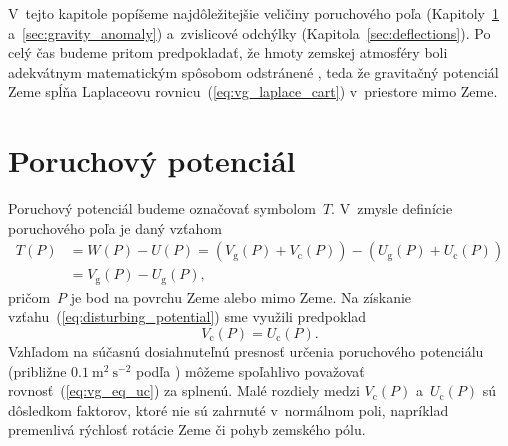 \documentclass[a4paper, 12pt]{book}
\newcommand{\gidx}{\mathrm g}
\newcommand{\cidx}{\mathrm c}
\begin{document}
V~tejto kapitole popíšeme najdôležitejšie veličiny poruchového poľa 
(Kapitoly~\ref{sec:disturbing_potential} a~\ref{sec:gravity_anomaly}) 
a~zvislicové odchýlky (Kapitola~\ref{sec:deflections}).  Po celý čas budeme 
pritom predpokladať, že hmoty zemskej atmosféry boli adekvátnym matematickým 
spôsobom odstránené \parencite[pozri napríklad][]{Janak2006}, teda že 
gravitačný potenciál Zeme spĺňa Laplaceovu rovnicu~(\ref{eq:vg_laplace_cart}) 
v~priestore mimo Zeme.






\section{Poruchový potenciál}
\label{sec:disturbing_potential}

Poruchový potenciál budeme označovať symbolom~$T$.  V~zmysle definície 
poruchového poľa je daný vzťahom
%
\begin{equation}
\label{eq:disturbing_potential}
\begin{split}
T(P) &= W(P) - U(P) = (V_\gidx(P) + V_\cidx(P)) - (U_\gidx(P) + U_\cidx(P))\\
%
&= V_\gidx(P) - U_\gidx(P){,}
\end{split}
\end{equation}
%
pričom~$P$ je bod na povrchu Zeme alebo mimo Zeme.  Na získanie 
vzťahu~(\ref{eq:disturbing_potential}) sme využili predpoklad
%
\begin{equation}
\label{eq:vg_eq_uc}
V_\cidx(P) = U_\cidx(P){.}
\end{equation}
%
Vzhľadom na súčasnú dosiahnuteľnú presnosť určenia poruchového potenciálu 
(približne $0.1\ \mathrm{m}^2 \ \mathrm{s}^{-2}$ podľa 
\cite{SansoGeoidDetermination}) môžeme spoľahlivo považovať 
rovnosť~(\ref{eq:vg_eq_uc}) za splnenú.  Malé rozdiely medzi $V_\cidx(P)$ 
a~$U_\cidx(P)$ sú dôsledkom faktorov, ktoré nie sú zahrnuté v~normálnom poli, 
napríklad premenlivá rýchlosť rotácie Zeme či pohyb zemského pólu.
\end{document}
